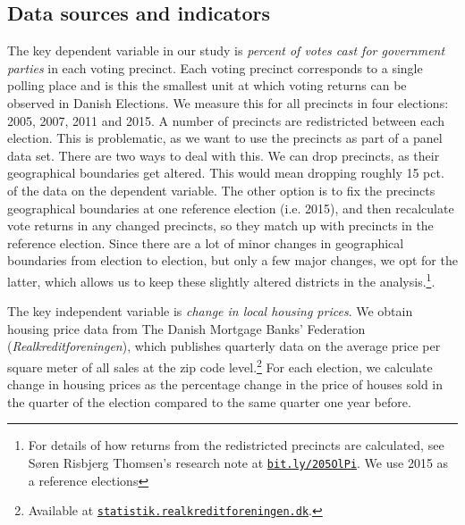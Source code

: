 \documentclass[12pt,a4paper]{article}
\begin{document}
\subsection{Data sources and indicators}
The key dependent variable in our study is \textit{percent of votes cast for government parties} in each voting precinct. Each voting precinct corresponds to a single polling place and is this the smallest unit at which voting returns can be observed in Danish Elections. We measure this for all precincts in four elections:  2005, 2007, 2011 and 2015. A number of precincts are redistricted between each election. This is problematic, as we want to use  the precincts as part of a panel data set. There are two ways to deal with this. We can drop precincts, as their geographical boundaries get altered. This would mean dropping roughly 15 pct. of the data on the dependent variable. The other option is to fix the precincts geographical boundaries at one reference election (i.e. 2015), and then recalculate vote returns in any changed precincts, so they match up with precincts in the reference election. Since there are a lot of minor changes in geographical boundaries from election to election, but only a few major changes, we opt for the latter, which allows us to keep these slightly altered districts in the analysis.\footnote{For details of how returns from the redistricted precincts are calculated, see Søren Risbjerg Thomsen's research note at \texttt{\href{http://bit.ly/205OlPi}{bit.ly/205OlPi}}.  We use 2015 as a reference elections}. 

The key independent variable is \textit{change in local housing prices}. We obtain housing price data from The Danish Mortgage Banks' Federation (\textit{Realkreditforeningen}), which publishes quarterly data on the average price per square meter of all sales at the zip code level.\footnote{Available at \texttt{\href{http://statistik.realkreditforeningen.dk/}{statistik.realkreditforeningen.dk}}.} For each election, we calculate change in housing prices as the percentage change in the price of houses sold in the quarter of the election compared to the same quarter one year before. 
\end{document}
